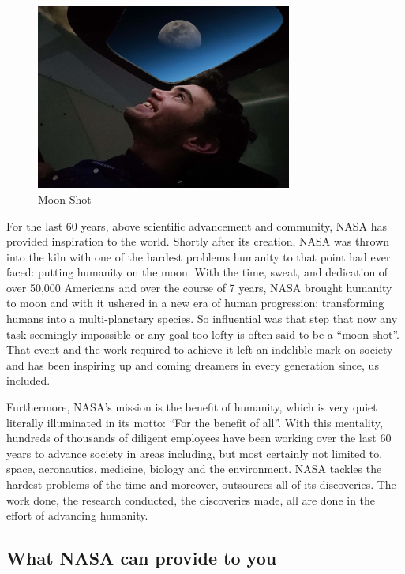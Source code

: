 \documentclass{article}
\let\Oldsubsection\subsection
\renewcommand{\subsection}{\FloatBarrier\Oldsubsection}
\begin{document}
\begin{figure}[!htb]
  \centering
  \includegraphics[width=0.75\textwidth]{assets/smilingatthemoon.jpg}
  \caption{Moon Shot}
  \label{fig:smilingatthemoon}
\end{figure}

For the last 60 years, above scientific advancement and community, NASA has provided inspiration to the world. Shortly after its creation, NASA was thrown into the kiln with one of the hardest problems humanity to that point had ever faced: putting humanity on the moon. With the time, sweat, and dedication of over 50,000 Americans and over the course of 7 years, NASA brought humanity to moon and with it ushered in a new era of human progression: transforming humans into a multi-planetary species. So influential was that step that now any task seemingly-impossible or any goal too lofty is often said to be a “moon shot”. That event and the work required to achieve it left an indelible mark on society and has been inspiring up and coming dreamers in every generation since, us included. 

Furthermore, NASA’s mission is the benefit of humanity, which is very quiet literally illuminated in its motto: “For the benefit of all”. With this mentality, hundreds of thousands of diligent employees have been working over the last 60 years to advance society in areas including, but most certainly not limited to, space, aeronautics, medicine, biology and the environment. NASA tackles the hardest problems of the time and moreover, outsources all of its discoveries. The work done, the research conducted, the discoveries made, all are done in the effort of advancing humanity.

\subsection{What NASA can provide to you}
\end{document}
